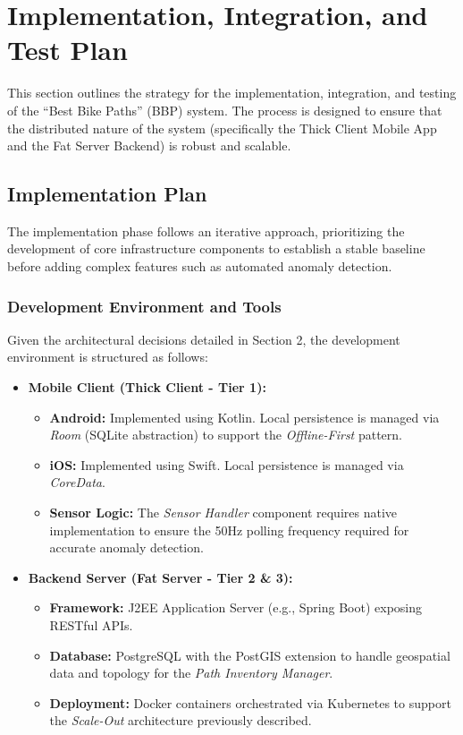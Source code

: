 \section{Implementation, Integration, and Test Plan}
\label{sec:implementation_integration_test}

This section outlines the strategy for the implementation, integration, and testing of the ``Best Bike Paths'' (BBP) system. The process is designed to ensure that the distributed nature of the system (specifically the Thick Client Mobile App and the Fat Server Backend) is robust and scalable.

\subsection{Implementation Plan}
The implementation phase follows an iterative approach, prioritizing the development of core infrastructure components to establish a stable baseline before adding complex features such as automated anomaly detection.

\subsubsection{Development Environment and Tools}
Given the architectural decisions detailed in Section 2, the development environment is structured as follows:

\begin{itemize}
    \item \textbf{Mobile Client (Thick Client - Tier 1):}
    \begin{itemize}
        \item \textbf{Android:} Implemented using Kotlin. Local persistence is managed via \textit{Room} (SQLite abstraction) to support the \textit{Offline-First} pattern.
        \item \textbf{iOS:} Implemented using Swift. Local persistence is managed via \textit{CoreData}.
        \item \textbf{Sensor Logic:} The \textit{Sensor Handler} component requires native implementation to ensure the 50Hz polling frequency required for accurate anomaly detection.
    \end{itemize}
    
    \item \textbf{Backend Server (Fat Server - Tier 2 \& 3):}
    \begin{itemize}
        \item \textbf{Framework:} J2EE Application Server (e.g., Spring Boot) exposing RESTful APIs.
        \item \textbf{Database:} PostgreSQL with the PostGIS extension to handle geospatial data and topology for the \textit{Path Inventory Manager}.
        \item \textbf{Deployment:} Docker containers orchestrated via Kubernetes to support the \textit{Scale-Out} architecture previously described.
    \end{itemize}
\end{itemize}
\clearpage

